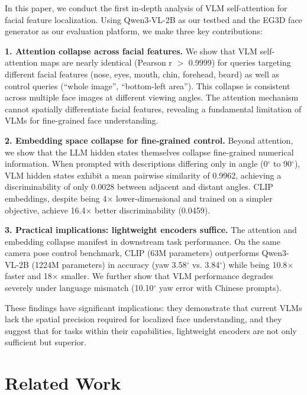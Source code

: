 \documentclass[10pt,twocolumn,letterpaper]{article}
\begin{document}
In this paper, we conduct the first in-depth analysis of VLM self-attention for facial feature localization. Using Qwen3-VL-2B as our testbed and the EG3D face generator as our evaluation platform, we make three key contributions:

\noindent\textbf{1. Attention collapse across facial features.} We show that VLM self-attention maps are nearly identical (Pearson r $>$ 0.9999) for queries targeting different facial features (nose, eyes, mouth, chin, forehead, beard) as well as control queries (``whole image'', ``bottom-left area''). This collapse is consistent across multiple face images at different viewing angles. The attention mechanism cannot spatially differentiate facial features, revealing a fundamental limitation of VLMs for fine-grained face understanding.

\noindent\textbf{2. Embedding space collapse for fine-grained control.} Beyond attention, we show that the LLM hidden states themselves collapse fine-grained numerical information. When prompted with descriptions differing only in angle (0$^\circ$ to 90$^\circ$), VLM hidden states exhibit a mean pairwise similarity of 0.9962, achieving a discriminability of only 0.0028 between adjacent and distant angles.
CLIP embeddings, despite being 4$\times$ lower-dimensional and trained on a simpler objective, achieve 16.4$\times$ better discriminability (0.0459).

\noindent\textbf{3. Practical implications: lightweight encoders suffice.} The attention and embedding collapse manifest in downstream task performance. On the same camera pose control benchmark, CLIP (63M parameters) outperforms Qwen3-VL-2B (1224M parameters) in accuracy (yaw 3.58$^\circ$ vs. 3.84$^\circ$) while being 10.8$\times$ faster and 18$\times$ smaller. We further show that VLM performance degrades severely under language mismatch (10.10$^\circ$ yaw error with Chinese prompts).

These findings have significant implications: they demonstrate that current VLMs lack the spatial precision required for localized face understanding, and they suggest that for tasks within their capabilities, lightweight encoders are not only sufficient but superior.

\section{Related Work}
\label{sec:related}
\end{document}
